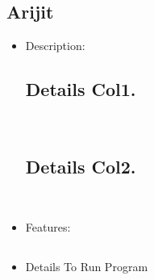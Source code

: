 \documentclass{article}
\begin{document}
\subsection*{Arijit}
\begin{itemize}
    \subsection*{Program Name}


    \item Description: 
    
    \subsection*{Details Col1.}\\

    \subsection*{Details Col2.}\\

    \item Features: 
    \subsection*{}
    \subsection*{}
    \subsection*{}
    \subsection*{}

\item Details To Run Program 

\subsection*{}\\

\subsection*{}\\

\subsection*{}\\

\end{itemize}
\end{document}

